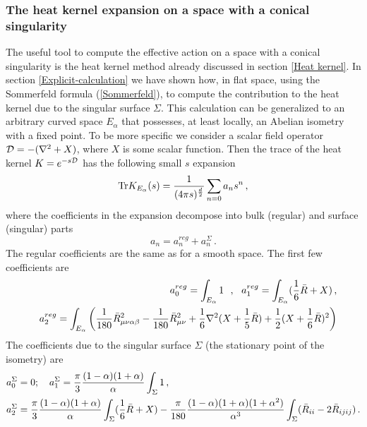 \documentclass[12pt]{article}
\def\tr{\hbox{Tr}}
\def\o{\over}
\begin{document}
\subsubsection{The heat kernel expansion on a space with a conical singularity} 
The useful tool to compute the effective action on a space with a conical singularity is  the heat kernel method already discussed in  section
\ref{Heat kernel}. In section \ref{Explicit-calculation} we have shown how, in flat space, using the Sommerfeld formula (\ref{Sommerfeld}), to  compute the contribution  to the heat kernel due to the singular surface $\Sigma$. This calculation can be generalized to an arbitrary curved space $E_\alpha$ that  possesses, at least locally,  an Abelian isometry with a fixed point.
To be more specific we consider a  scalar field operator
${\cal D} =-(\nabla^2+ X)$, 
where $X$ is some scalar function.  Then  the trace of the heat kernel $K=e^{-s{\cal D}}$ has the following small $s$
expansion
\begin{eqnarray}
\tr K_{E_\alpha} (s)={1 \over (4\pi s)^{d \over
2}}
\sum_{n=0}^{}{} {a}_n s^n\, ,
\label{K expansion}
\end{eqnarray}
where the   coefficients in the expansion decompose into bulk (regular) and  surface (singular) parts
\begin{equation}
{a}_n={a}^{reg}_n + a^\Sigma_{n}\, .
\label{coefficient a}
\end{equation}
The regular coefficients are  the same as  for a smooth space. The first few coefficients are
\begin{eqnarray}
&&a_0^{reg}=\int_{E_\alpha} 1 \ \ , \ \ a^{reg}_1=\int_{E_\alpha}({1 \over 6}\bar{R}+X)\, ,
\nonumber \\
&&a^{reg}_2 =\int_{E_\alpha}\left({1 \over 180} \bar{R}^2_{\mu\nu\alpha\beta} -
{1 \over 180} \bar{R}^2_{\mu\nu} +{1 \over 6} \nabla^2(X+{1\o 5}\bar{R})+{1\o 2}(X+{1\o 6}\bar{R})^2\right)
\label{a-regular}
\end{eqnarray}
The coefficients  due to the singular surface $\Sigma$ (the stationary
point of the
isometry) are
\begin{align}
a_{0}^\Sigma &=0; \ \ \ a^\Sigma_{1}={\pi \over
3}{(1-\alpha)(1+\alpha)
\over
\alpha}
\int_{\Sigma}^{}1 \, , \label{a-singular} \\
a^\Sigma_{2}&={\pi \over 3} {(1-\alpha)(1+\alpha) \over \alpha}
\int_{\Sigma}^{}({1 \over 6}\bar{R}+X) -{\pi \over 180}
{(1-\alpha)(1+\alpha)(1+\alpha^2) \over \alpha^3}
\int_{\Sigma}^{}(\bar{R}_{ii}
-2\bar{R}_{ijij})\, .
\nonumber
\end{align}
\end{document}
